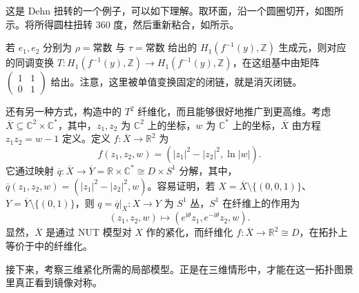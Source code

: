 \begin{construction}
这是 Dehn 扭转的一个例子，可以如下理解。取环面，沿一个圆圈切开，如图所示。将所得圆柱扭转 $360$ 度，然后重新粘合，如所示。
\begin{figure}[H]
\centering
{}
\BookNumberOnlyCaption\label{fig:6.6}
\end{figure}
若 $e_1,e_2$ 分别为 $\rho=\text{常数}$ 与 $\tau=\text{常数}$ 给出的 $H_1(f^{-1}(y),\mathbb Z)$ 生成元，则对应的同调变换 $T\colon H_1(f^{-1}(y),\mathbb Z)\to H_1(f^{-1}(y),\mathbb Z)$，在这组基中由矩阵 $\begin{pmatrix}1&1\\0&1\end{pmatrix}$ 给出。注意，这里被单值变换固定的闭链，就是消灭闭链。
\end{construction}

\begin{construction}\label{constr:6.87}
还有另一种方式，构造中的 $T^2$ 纤维化，而且能够很好地推广到更高维。考虑 $\overline X\subseteq\mathbb C^2\times\mathbb C^*$，其中，$z_1,z_2$ 为 $\mathbb C^2$ 上的坐标，$w$ 为 $\mathbb C^*$ 上的坐标，$\overline X$ 由方程 $z_1z_2=w-1$ 定义。定义 $f\colon\overline X\to\mathbb R^2$ 为
\[
f(z_1,z_2,w)=(|z_1|^2-|z_2|^2,\ln|w|).
\]
它通过映射 $\overline q\colon\overline X\to\overline Y=\mathbb R\times\mathbb C^*\cong D\times S^1$ 分解，其中，$\overline q(z_1,z_2,w)=(|z_1|^2-|z_2|^2,w)$。容易证明，若 $X=\overline X\setminus\{(0,0,1)\}$、$Y=\overline Y\setminus\{(0,1)\}$，则 $q=\overline q|_X\colon X\to Y$ 为 $S^1$ 丛，$S^1$ 在纤维上的作用为
\[
(z_1,z_2,w)\longmapsto(e^{\mathrm i\theta}z_1,e^{-\mathrm i\theta}z_2,w).
\]
显然，$\overline X$ 是通过 NUT 模型对 $X$ 作的紧化，而纤维化 $f\colon\overline X\to\mathbb R^2\cong D$，在拓扑上等价于中的纤维化。
\end{construction}

接下来，考察三维紧化所需的局部模型。正是在三维情形中，才能在这一拓扑图景里真正看到镜像对称。

